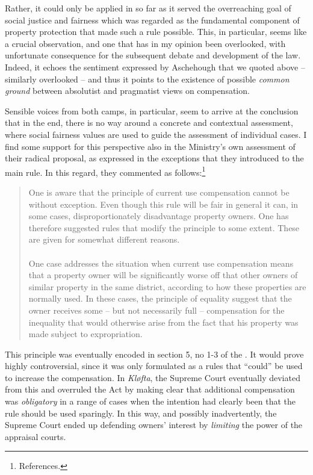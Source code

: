 Rather, it could only be applied in so far as it served the overreaching goal of social justice and fairness which was regarded as the fundamental component of property protection that made such a rule possible. This, in particular, seems like a crucial observation, and one that has in my opinion been overlooked, with unfortunate consequence for the subsequent debate and development of the law. Indeed, it echoes the sentiment expressed by Aschehough that we quoted above -- similarly overlooked -- and thus it points to the existence of possible \emph{common ground} between absolutist and pragmatist views on compensation. 

Sensible voices from both camps, in particular, seem to arrive at the conclusion that in the end, there is no way around a concrete and contextual assessment, where social fairness values are used to guide the assessment of individual cases. I find some support for this perspective also in the Ministry's own assessment of their radical proposal, as expressed in the exceptions that they introduced to the main rule. In this regard, they commented as follows:\footnote{References.}

\begin{quote}
One is aware that the principle of current use compensation cannot be without exception. Even though this rule will be fair in general it can, in some cases, disproportionately disadvantage property owners. One has therefore suggested rules that modify the principle to some extent. These are given for somewhat different  reasons. \\ \\

One case addresses the situation when current use compensation means that a property owner will be significantly worse off that other owners of similar property in the same district, according to how these properties are normally used. In these cases, the principle of equality suggest that the owner receives some -- but not necessarily full -- compensation for the inequality that would otherwise arise from the fact that his property was made subject to expropriation. %
\end{quote}

This principle was eventually encoded in section 5, no 1-3 of the \cite{ca73}. It would prove highly controversial, since it was only formulated as a rules that ``could'' be used to increase the compensation. In \emph{Kløfta}, the Supreme Court eventually deviated from this and overruled the Act by making clear that additional compensation was \emph{obligatory} in a range of cases when the intention had clearly been that the rule should be used sparingly. In this way, and possibly inadvertently, the Supreme Court ended up defending owners' interest by \emph{limiting} the power of the appraisal courts.

